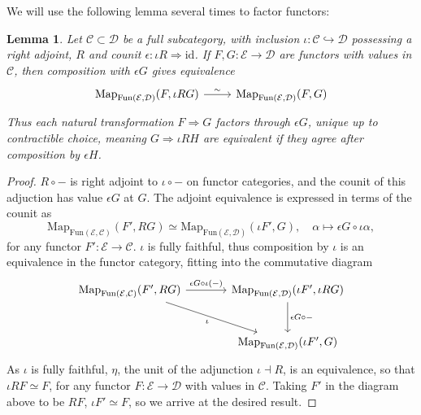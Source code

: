 \documentclass[11pt, twoside]{article}
\numberwithin{equation}{section}
\newtheorem{lemma}[equation]{Lemma}
\theoremstyle{definition}
\newcommand{\id}{\mathrm{id} }
\newcommand{\fun}{\mathrm{Fun}}
\newcommand{\Map}{\mathrm{Map}}
\begin{document}
We will use the following lemma several times to factor functors:

\begin{lemma}\label{lemm:fun-fact}
Let \(\mathcal{C} \subset \mathcal{D}\) be a full subcategory, with inclusion \(\iota \colon \mathcal{C} \hookrightarrow \mathcal{D}\) possessing a right adjoint, \(R\) and counit \(\epsilon \colon \iota R \Longrightarrow \id\). If \(F, G \colon \mathcal{E} \to \mathcal{D}\) are functors with values in \(\mathcal{C}\), then composition with \(\epsilon G\) gives equivalence 
\[\begin{tikzcd}
\mathrm{Map}_{\fun(\mathcal{E}, \mathcal{D})}(F, \iota RG) \ar[r, "\sim"] & \mathrm{Map}_{\fun(\mathcal{E}, \mathcal{D})}(F, G)
\end{tikzcd}\]
Thus each natural transformation \(F \Longrightarrow G\) factors through \(\epsilon G\), unique up to contractible choice, meaning \(G \Longrightarrow \iota RH\) are equivalent if they agree after composition by \(\epsilon H\).
\end{lemma}

\begin{proof}
\(R \circ - \) is right adjoint to \(\iota \circ -\) on functor categories, and the counit of this adjuction has value \(\epsilon G\) at \(G\). The adjoint equivalence is expressed in terms of the counit as 
\[\Map_{\fun(\mathcal{E}, \mathcal{C})}(F', RG) \simeq \Map_{\fun(\mathcal{E}, \mathcal{D})}(\iota F', G), \quad \alpha \mapsto \epsilon G \circ \iota \alpha,\]
for any functor \(F' \colon \mathcal{E} \to \mathcal{C}\). \(\iota\) is fully faithful, thus composition by \(\iota\) is an equivalence in the functor category, fitting into the commutative diagram 
\[\begin{tikzcd} [row sep = large, column sep = large]
\Map_{\fun(\mathcal{E}, \mathcal{C})}(F', RG) \ar[dr, "\iota", swap] \ar[r, "\epsilon G \circ \iota (- )"] & \Map_{\fun(\mathcal{E}, \mathcal{D})}(\iota F', \iota RG) \ar[d, "\epsilon G \circ - "]\\
& \Map_{\fun(\mathcal{E}, \mathcal{D})}(\iota F', G)
\end{tikzcd}\]
As \(\iota\) is fully faithful, \(\eta\), the unit of the adjunction \(\iota \dashv R\), is an equivalence, so that \(\iota R F \simeq F\), for any functor \(F \colon \mathcal{E} \to \mathcal{D}\) with values in \(\mathcal{C}\). Taking \(F'\) in the diagram above to be \(RF\), \(\iota F' \simeq F\), so we arrive at the desired result.
\end{proof}
\end{document}
